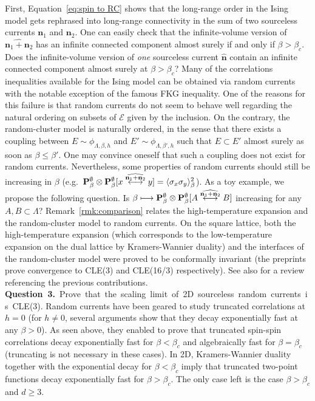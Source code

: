 \documentclass[a4paper,oneside,11pt]{article}
\begin{document}
First, 
Equation~\eqref{eq:spin to RC} shows that the long-range order in the Ising model gets rephrased into long-range connectivity in the sum of two sourceless currents $\mathbf n_1$ and $\mathbf n_2$. One can easily check that the infinite-volume version of $\widehat{\mathbf n_1+\mathbf n_2}$ has an infinite connected component almost surely if and only if $\beta>\beta_c$. 
\medbreak
{} Does the infinite-volume version of {\em one} sourceless current $\widehat{\mathbf n}$ contain an infinite connected component almost surely at $\beta>\beta_c$?
\medbreak
Many of the correlations inequalities available for the Ising model can be obtained via random currents with the notable exception of the famous FKG inequality. One of the reasons for this failure is that random currents do not seem to behave well regarding the natural ordering on subsets of $\mathcal E$ given by the inclusion. On the contrary, the random-cluster model is naturally ordered, in the sense that there exists a coupling between $E\sim \phi_{\Lambda,\beta,h}$ and $E'\sim\phi_{\Lambda,\beta',h}$ such that $E\subset E'$ almost surely as soon as $\beta\le \beta'$. One may convince oneself that such a coupling does not exist for random currents. Nevertheless, some properties of random currents should still be increasing in $\beta$ (e.g.~${\bf P}^\emptyset_\beta\otimes{\bf P}^\emptyset_\beta[x\lr[\widehat{{\mathbf n}_1+{\mathbf n} _2}]y]=\langle\sigma_x\sigma_y\rangle_\beta^2$). As a toy example, we propose the following question.
\medbreak
{} Is $\beta\longmapsto{\bf P}^\emptyset_\beta\otimes{\bf P}^\emptyset_\beta[A\lr[\widehat{{\mathbf n}_1+{\mathbf n} _2}]B]$ increasing for any $A,B\subset \Lambda$?
\medbreak
Remark~\ref{rmk:comparison} relates the high-temperature expansion and the random-cluster model to random currents. 
 On the square lattice, both the high-temperature expansion (which corresponds to the low-temperature expansion on the dual lattice by Kramers-Wannier duality) and the interfaces of the random-cluster model were proved to be conformally invariant \cite{CheDumHon14} (the preprints \cite{BenHon16,KemSmi15} prove convergence to CLE(3) and CLE(16/3) respectively). See also \cite{DumSmi12} for a review referencing the previous contributions. \medbreak\noindent
{\bf Question~3.}~Prove~that~the~scaling~limit~of~2D~sourceless~random~currents~is~CLE(3).
\medbreak
Random currents have been geared to study truncated correlations at $h=0$ (for $h\ne0$, several arguments show that they decay exponentially fast at any $\beta>0$). As seen above, they enabled to prove that truncated spin-spin correlations decay exponentially fast for $\beta<\beta_c$  and algebraically fast for $\beta=\beta_c$ (truncating is not necessary in these cases). In 2D, Kramers-Wannier duality together with the exponential decay for $\beta<\beta_c$ imply that truncated two-point functions decay exponentially fast for $\beta>\beta_c$. The only case left is the case $\beta>\beta_c$ and $d\ge3$.
\end{document}
